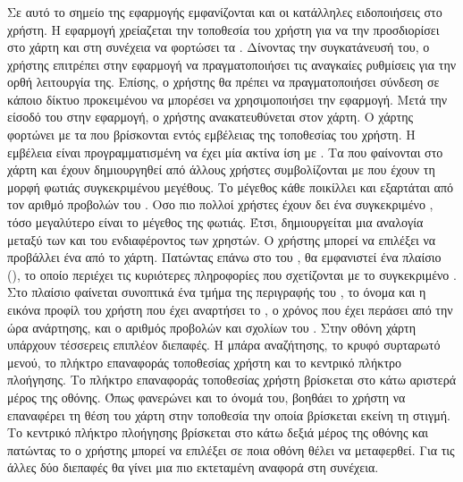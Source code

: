 \subsubsection{}

Σε αυτό το σημείο της εφαρμογής εμφανίζονται και οι κατάλληλες ειδοποιήσεις στο χρήστη. Η εφαρμογή χρείαζεται την τοποθεσία του χρήστη για να την προσδιορίσει στο χάρτη και στη συνέχεια να φορτώσει τα . Δίνοντας την συγκατάνευσή του, ο χρήστης επιτρέπει στην εφαρμογή να πραγματοποιήσει τις αναγκαίες ρυθμίσεις για την ορθή λειτουργία της. Επίσης, ο χρήστης θα πρέπει να πραγματοποιήσει σύνδεση σε κάποιο δίκτυο προκειμένου να μπορέσει να χρησιμοποιήσει την εφαρμογή.
\newline
\indent
Μετά την είσοδό του στην εφαρμογή, ο χρήστης ανακατευθύνεται στον χάρτη. Ο χάρτης φορτώνει με τα  που βρίσκονται εντός εμβέλειας της τοποθεσίας του χρήστη. Η εμβέλεια είναι προγραμματισμένη να έχει μία ακτίνα ίση με . Τα  που φαίνονται στο χάρτη και έχουν δημιουργηθεί από άλλους χρήστες συμβολίζονται με  που έχουν τη μορφή φωτιάς συγκεκριμένου μεγέθους. Το μέγεθος κάθε  ποικίλλει και εξαρτάται από τον αριθμό προβολών του . Οσο πιο πολλοί χρήστες έχουν δει ένα συγκεκριμένο , τόσο μεγαλύτερο είναι το μέγεθος της φωτιάς. Έτσι, δημιουργείται μια αναλογία μεταξύ των  και του ενδιαφέροντος των χρηστών.
\newline
\indent
Ο χρήστης μπορεί να επιλέξει να προβάλλει ένα  από το χάρτη. Πατώντας επάνω στο  του , θα εμφανιστεί ένα πλαίσιο (), το οποίο περιέχει τις κυριότερες πληροφορίες που σχετίζονται με το συγκεκριμένο . Στο πλαίσιο φαίνεται συνοπτικά ένα τμήμα της περιγραφής του , το όνομα και η εικόνα προφίλ του χρήστη που έχει αναρτήσει το , ο χρόνος που έχει περάσει από την ώρα ανάρτησης, και ο αριθμός προβολών και σχολίων του . 
\newline
\indent
Στην οθόνη χάρτη υπάρχουν τέσσερεις επιπλέον διεπαφές. Η μπάρα αναζήτησης, το κρυφό συρταρωτό μενού, το πλήκτρο επαναφοράς τοποθεσίας χρήστη και το κεντρικό πλήκτρο πλοήγησης. Το πλήκτρο επαναφοράς τοποθεσίας χρήστη βρίσκεται στο κάτω αριστερά μέρος της οθόνης. Όπως φανερώνει και το όνομά του, βοηθάει το χρήστη να επαναφέρει τη θέση του χάρτη στην τοποθεσία την οποία βρίσκεται εκείνη τη στιγμή. Το κεντρικό πλήκτρο πλοήγησης βρίσκεται στο κάτω δεξιά μέρος της οθόνης και πατώντας το ο χρήστης μπορεί να επιλέξει σε ποια οθόνη θέλει να μεταφερθεί. Για τις άλλες δύο διεπαφές θα γίνει μια πιο εκτεταμένη αναφορά στη συνέχεια. 

